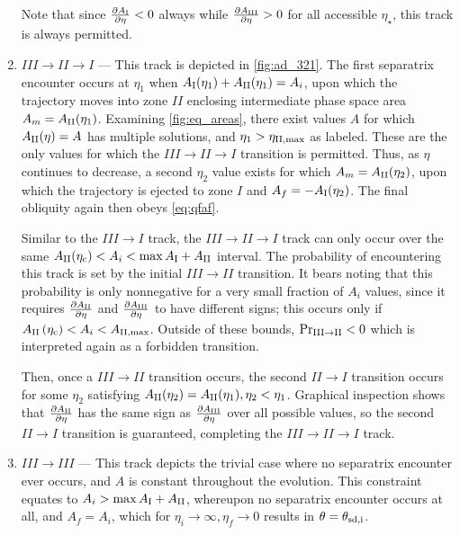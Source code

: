 \documentclass[
        fleqn,
        usenatbib,
        referee,
    ]{mnras}
\newcommand*{\pd}[2]{\frac{\partial#1}{\partial#2}}
\newcommand*{\p}[1]{\left(#1\right)}
\begin{document}
\begin{enumerate}
        Note that since $\pd{A_{\rm I}}{\eta} < 0$ always while $\pd{A_{\rm
        III}}{\eta} > 0$ for all accessible $\eta_{\star}$, this track is always
        permitted.

    \item $III \to II \to I$ --- This track is depicted in \autoref{fig:ad_321}.
        The first separatrix encounter occurs at $\eta_1$ when $A_{\rm
        I}(\eta_1) + A_{\rm II}(\eta_1) = A_i$, upon which the trajectory moves
        into zone $II$ enclosing intermediate phase space area $A_m = A_{\rm
        II}(\eta_1)$. Examining \autoref{fig:eq_areas}, there exist values $A$
        for which $A_{\rm II}(\eta) = A$ has multiple solutions, and $\eta_1 >
        \eta_{\rm II, \max}$ as labeled. These are the only values for which the
        $III \to II \to I$ transition is permitted. Thus, as $\eta$ continues to
        decrease, a second $\eta_2$ value exists for which $A_m = A_{\rm
        II}(\eta_2)$, upon which the trajectory is ejected to zone $I$ and $A_f
        = -A_{\rm I}(\eta_2)$. The final obliquity again then obeys
        \autoref{eq:qfaf}.

        Similar to the $III \to I$ track, the $III \to II \to I$ track can only
        occur over the same $A_{\rm II}(\eta_{\rm c}) < A_i < \max A_{\rm I} + A_{\rm
        II}$ interval. The probability of encountering this track is set by the
        initial $III \to II$ transition. It bears noting that this probability
        is only nonnegative for a very small fraction of $A_i$ values, since it
        requires $\pd{A_{\rm II}}{\eta}$ and $\pd{A_{\rm III}}{\eta}$ to have
        different signs; this occurs only if $A_{\rm II}\p{\eta_{\rm c}} < A_i <
        A_{\rm II, \max}$. Outside of these bounds, $\Pr_{\rm III \to II} < 0$
        which is interpreted again as a forbidden transition.

        Then, once a $III \to II$ transition occurs, the second $II \to I$
        transition occurs for some $\eta_2$ satisfying $A_{\rm II}(\eta_2) =
        A_{\rm II}(\eta_1), \eta_2 < \eta_1$. Graphical inspection shows that
        $\pd{A_{\rm II}}{\eta}$ has the same sign as $\pd{A_{\rm III}}{\eta}$
        over all possible values, so the second $II \to I$ transition is
        guaranteed, completing the $III \to II \to I$ track.

    \item $III \to III$ --- This track depicts the trivial case where no
        separatrix encounter ever occurs, and $A$ is constant throughout the
        evolution. This constraint equates to $A_i > \max A_{\rm I} + A_{\rm
        II}$, whereupon no separatrix encounter occurs at all, and $A_f = A_i$,
        which for $\eta_i \to \infty, \eta_f \to 0$ results in $\theta =
        \theta_{\rm sd, i}$.


\end{enumerate}
\end{document}

